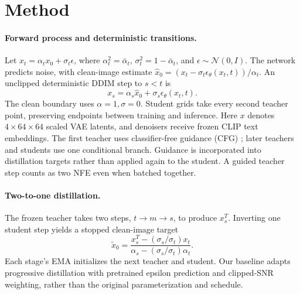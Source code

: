 \documentclass[10pt,twocolumn,letterpaper]{article}
\begin{document}
\section{Method}
\paragraph{Forward process and deterministic transitions.}
Let $x_t=\alpha_t x_0+\sigma_t\epsilon$, where
$\alpha_t^2=\bar\alpha_t$, $\sigma_t^2=1-\bar\alpha_t$, and
$\epsilon\sim\mathcal N(0,I)$. The network predicts noise, with clean-image
estimate $\hat x_0=(x_t-\sigma_t\epsilon_\theta(x_t,t))/\alpha_t$.
An unclipped deterministic DDIM step to $s<t$ is
\begin{equation}
 x_s=\alpha_s\hat x_0+\sigma_s\epsilon_\theta(x_t,t).
\end{equation}
The clean boundary uses $\alpha=1,\sigma=0$. Student grids take every second
teacher point, preserving endpoints between training and inference.
\ifStudySD
Here $x$ denotes $4\times64\times64$ scaled VAE latents, and denoisers receive
frozen CLIP text embeddings. The first teacher uses classifier-free guidance
(CFG) \StudyGuidance{}; later teachers and students use one conditional branch.
Guidance is incorporated into distillation targets rather than applied again to
the student. A guided teacher step counts as two NFE even when batched together.
\fi

\paragraph{Two-to-one distillation.}
The frozen teacher takes two steps, $t\rightarrow m\rightarrow s$, to produce
$x_s^T$. Inverting one student step yields a stopped clean-image target
\begin{equation}
 \tilde x_0=\frac{x_s^T-(\sigma_s/\sigma_t)x_t}
 {\alpha_s-(\sigma_s/\sigma_t)\alpha_t}.
\end{equation}
Each stage's EMA initializes the next teacher and student. Our baseline adapts
progressive distillation with pretrained epsilon prediction and clipped-SNR
weighting, rather than the original parameterization and schedule.
\end{document}
